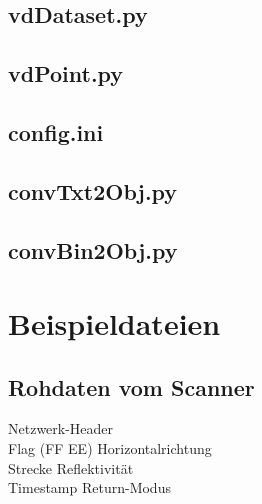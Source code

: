 \documentclass[a4paper,12pt,bibliography=totoc, listof=totoc,titlepage,pointlessnumbers]{scrreprt}
\begin{document}
\begin{appendices}
\section{vdDataset.py}
\label{a:vdDataset.py}


\section{vdPoint.py}
\label{a:vdPoint.py}


\section{config.ini}
\label{a:config.ini}


\section{convTxt2Obj.py}
\label{a:convToObj.py}


\section{convBin2Obj.py}
\label{a:convBin2Obj.py}


\chapter{Beispieldateien}

\section{Rohdaten vom Scanner}
\label{a:Rohdaten}

{\color{gray} Netzwerk-Header}\\
{\color{red} Flag (FF EE)} {\color{green} Horizontalrichtung}\\
{\color{blue} Strecke} {\color{orange} Reflektivität}\\
{\color{yellow} Timestamp } {\color{violet} Return-Modus}\\
\\


\end{appendices}
\end{document}
